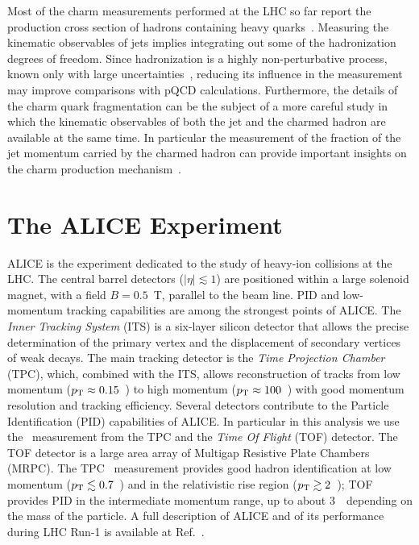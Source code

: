 \documentclass[a4paper]{jpconf}
\begin{document}
Most of the charm measurements performed at the LHC so far report the production cross section of hadrons
containing heavy quarks~\cite{ALICE:2012d, LHCb:2013a, ATLAS:2016a, ALICE:2016b}.
Measuring the kinematic observables of jets implies integrating out some of the hadronization degrees of freedom. 
Since hadronization is a highly non-perturbative process, known only with large uncertainties~\cite{dEnterria:2014}, 
reducing its influence in the measurement may improve comparisons with pQCD calculations.
Furthermore, the details of the charm quark fragmentation can be the subject of a more careful study in which the kinematic observables 
of both the jet and the charmed hadron are available at the same time. In particular the measurement of the fraction of the jet momentum carried 
by the charmed hadron can provide important insights on the charm production mechanism~\cite{CDF:1990, UA1:1990, STAR:2009a, ATLAS:2012d}.

\section{The ALICE Experiment}
ALICE is the experiment dedicated to the study of heavy-ion collisions at the LHC.
The central barrel detectors ($\lvert \eta\rvert \lesssim 1$) are positioned within a large solenoid magnet, with a
field $B = 0.5$~T, parallel to the beam line.
PID and low-momentum tracking capabilities are among the strongest points of ALICE.
The \emph{Inner Tracking System} (ITS) is a six-layer silicon detector that allows the precise determination of the primary vertex 
and the displacement of secondary vertices of weak decays.
The main tracking detector is the \emph{Time Projection Chamber} (TPC), which, combined with the ITS, allows reconstruction of tracks 
from low momentum ($p_{\rm T}\approx0.15$~\GeVc) to high momentum
($p_{\rm T}\approx100$~\GeVc) with good momentum resolution and tracking efficiency.
Several detectors contribute to the Particle Identification (PID) capabilities of ALICE. 
In particular in this analysis we use the \dedx\ measurement from the TPC and
the \emph{Time Of Flight} (TOF) detector. The TOF detector is a large area array of Multigap Resistive Plate Chambers (MRPC).
The TPC \dedx\ measurement provides good hadron identification at low momentum ($p_{\rm T}\lesssim0.7$~\GeVc) and 
in the relativistic rise region ($p_{\rm T}\gtrsim2$~\GeVc);
TOF provides PID in the intermediate momentum range,
up to about $3$~\GeVc\ depending on the mass of the particle.
A full description of ALICE and of its performance during LHC Run-1 is available at Ref.~\cite{ALICE:2014b}.
\end{document}
